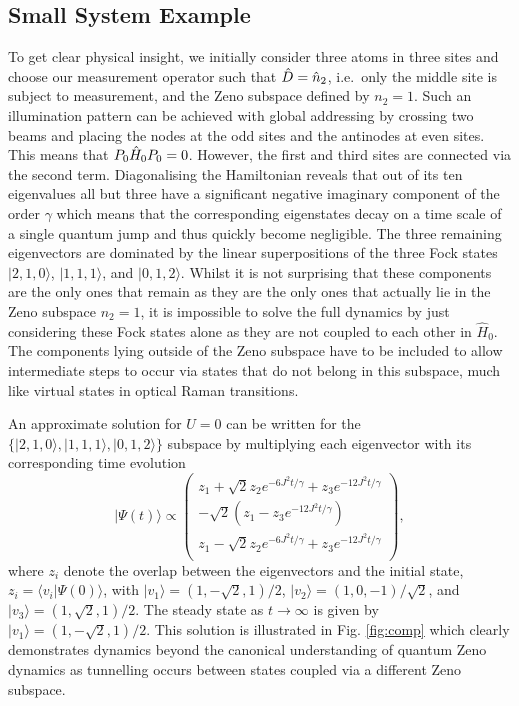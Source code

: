 \subsection{Small System Example}

To get clear physical insight, we initially consider three atoms in
three sites and choose our measurement operator such that
$\hat{D} = \hat{n}_2$, i.e.~only the middle site is subject to measurement,
and the Zeno subspace defined by $n_2 = 1$. Such an illumination
pattern can be achieved with global addressing by crossing two beams
and placing the nodes at the odd sites and the antinodes at even
sites. This means that $P_0 \hat{H}_0 P_0 = 0$. However, the
first and third sites are connected via the second term. Diagonalising
the Hamiltonian reveals that out of its ten eigenvalues all but three
have a significant negative imaginary component of the order $\gamma$
which means that the corresponding eigenstates decay on a time scale
of a single quantum jump and thus quickly become negligible. The three
remaining eigenvectors are dominated by the linear superpositions of
the three Fock states $|2,1,0 \rangle$, $|1, 1, 1 \rangle$, and
$|0,1,2 \rangle$. Whilst it is not surprising that these components
are the only ones that remain as they are the only ones that actually
lie in the Zeno subspace $n_2 = 1$, it is impossible to solve the full
dynamics by just considering these Fock states alone as they are not
coupled to each other in $\hat{H}_0$. The components lying outside of
the Zeno subspace have to be included to allow intermediate steps to
occur via states that do not belong in this subspace, much like
virtual states in optical Raman transitions.

An approximate solution for $U=0$ can be written for the
$\{|2,1,0 \rangle, |1,1,1 \rangle, |0,1,2 \rangle\}$ subspace by
multiplying each eigenvector with its corresponding time evolution
\begin{equation}
  | \Psi(t) \rangle \propto \left( \begin{array}{c} 
  z_1 + \sqrt{2} z_2 e^{-6 J^2 t / \gamma} + z_3 e^{-12 J^2 t / \gamma} \\
  -\sqrt{2} \left(z_1 - z_3 e^{-12 J^2 t / \gamma} \right) \\ 
  z_1 - \sqrt{2} z_2 e^{-6 J^2 t / \gamma} + z_3 e^{-12 J^2 t /
                                     \gamma} \\ 
                                   \end{array} 
                                 \right),
\end{equation}
where $z_i$ denote the overlap between the eigenvectors and the
initial state, $z_i = \langle v_i | \Psi (0) \rangle$, with
$| v_1 \rangle = (1, -\sqrt{2}, 1)/2$,
$| v_2 \rangle = (1, 0, -1)/\sqrt{2}$, and
$| v_3 \rangle = (1, \sqrt{2}, 1)/2$. The steady state as
$t \rightarrow \infty$ is given by
$| v_1 \rangle = (1, -\sqrt{2}, 1)/2$. This solution is illustrated in
Fig. \ref{fig:comp} which clearly demonstrates dynamics beyond the
canonical understanding of quantum Zeno dynamics as tunnelling occurs
between states coupled via a different Zeno subspace.

